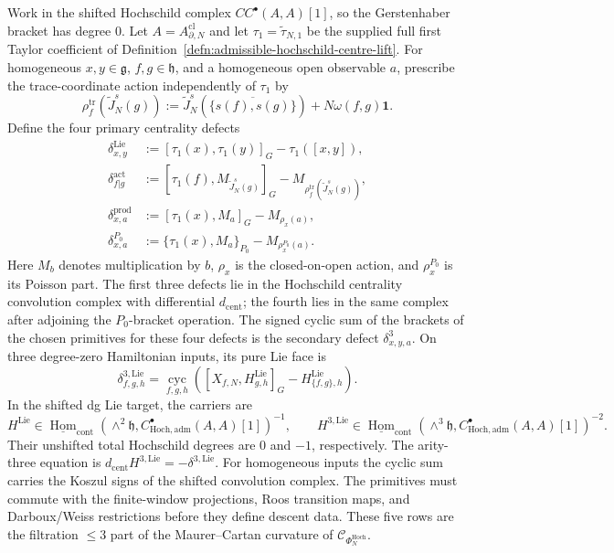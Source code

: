 \documentclass[11pt]{memoir}
\begin{document}
\begin{defn}
\label{defn:low-degree-hochschild-centrality-defects}
  Work in the shifted Hochschild complex \(CC^\bullet(A,A)[1]\), so the
  Gerstenhaber bracket has degree \(0\).  Let
  \(A=A^{\mathrm{cl}}_{\partial,N}\) and let
  \(\tau_1=\widetilde\tau_{N,1}\) be the supplied full first Taylor
  coefficient of
  Definition~\ref{defn:admissible-hochschild-centre-lift}.  For
  homogeneous \(x,y\in\mathfrak g\), \(f,g\in\mathfrak h\), and a
  homogeneous open observable \(a\), prescribe the trace-coordinate
  action independently of \(\tau_1\) by
  \[
    \rho_f^{\mathrm{tr}}\!\left(\widetilde J_N^s(g)\right)
      :=
      \widetilde J_N^s\!\left(
        \overline{\{s(f),s(g)\}}\right)
      +N\omega(f,g)\mathbf1 .
  \]
  Define the four
  primary centrality defects
  \[
    \begin{aligned}
      \delta^{\mathrm{Lie}}_{x,y}
        &:=[\tau_1(x),\tau_1(y)]_G-\tau_1([x,y]),\\
      \delta^{\mathrm{act}}_{f|g}
        &:=[\tau_1(f),M_{\widetilde J_N^s(g)}]_G
          -M_{\rho_f^{\mathrm{tr}}(\widetilde J_N^s(g))},\\
      \delta^{\mathrm{prod}}_{x,a}
        &:=[\tau_1(x),M_a]_G-M_{\rho_x(a)},\\
      \delta^{P_0}_{x,a}
        &:=\{\tau_1(x),M_a\}_{P_0}-M_{\rho_x^{P_0}(a)}.
    \end{aligned}
  \]
  Here \(M_b\) denotes multiplication by \(b\), \(\rho_x\) is the
  closed-on-open action, and \(\rho_x^{P_0}\) is its Poisson part.  The
  first three defects lie in the Hochschild centrality convolution
  complex with differential \(d_{\mathrm{cent}}\); the fourth lies in
  the same complex after adjoining the \(P_0\)-bracket operation.  The
  signed cyclic sum of the brackets of the chosen primitives for these
  four defects is the secondary defect
  \(\delta^3_{x,y,a}\).  On three degree-zero Hamiltonian inputs, its
  pure Lie face is
  \[
    \delta^{3,\mathrm{Lie}}_{f,g,h}
      =\underset{f,g,h}{\operatorname{cyc}}
        \left(
          [X_{f,N},H^{\mathrm{Lie}}_{g,h}]_G
          -H^{\mathrm{Lie}}_{\{f,g\},h}
        \right).
  \]
  In the shifted dg Lie target, the carriers are
  \[
    H^{\mathrm{Lie}}\in
      \underline{\operatorname{Hom}}_{\mathrm{cont}}
      \!\left(\wedge^2\mathfrak h,
        C^\bullet_{\mathrm{Hoch},\mathrm{adm}}(A,A)[1]\right)^{-1},
    \qquad
    H^{3,\mathrm{Lie}}\in
      \underline{\operatorname{Hom}}_{\mathrm{cont}}
      \!\left(\wedge^3\mathfrak h,
        C^\bullet_{\mathrm{Hoch},\mathrm{adm}}(A,A)[1]\right)^{-2}.
  \]
  Their unshifted total Hochschild degrees are \(0\) and \(-1\),
  respectively.  The arity-three equation is
  \(d_{\mathrm{cent}}H^{3,\mathrm{Lie}}=-\delta^{3,\mathrm{Lie}}\).
  For homogeneous inputs the cyclic sum carries the Koszul signs of the
  shifted convolution complex.  The primitives must commute with the
  finite-window projections, Roos transition maps, and Darboux/Weiss
  restrictions before they define descent data.  These five rows are the filtration
  \(\leq3\) part of the Maurer--Cartan curvature of
  \(\mathcal C_{\Phi_N^{\mathrm{Hoch}}}\).
\end{defn}
\end{document}
